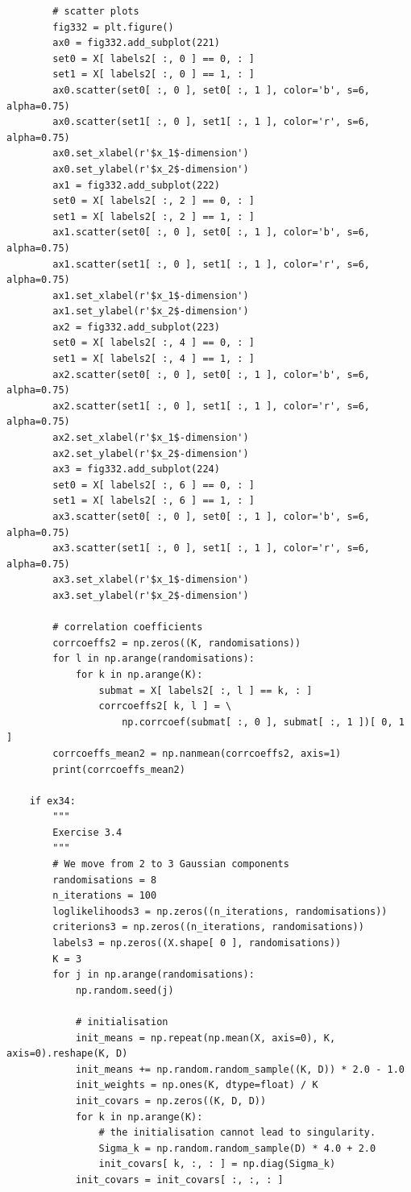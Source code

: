 \begin{verbatim}
        # scatter plots
        fig332 = plt.figure()
        ax0 = fig332.add_subplot(221)
        set0 = X[ labels2[ :, 0 ] == 0, : ]
        set1 = X[ labels2[ :, 0 ] == 1, : ]
        ax0.scatter(set0[ :, 0 ], set0[ :, 1 ], color='b', s=6, alpha=0.75)
        ax0.scatter(set1[ :, 0 ], set1[ :, 1 ], color='r', s=6, alpha=0.75)
        ax0.set_xlabel(r'$x_1$-dimension')
        ax0.set_ylabel(r'$x_2$-dimension')
        ax1 = fig332.add_subplot(222)
        set0 = X[ labels2[ :, 2 ] == 0, : ]
        set1 = X[ labels2[ :, 2 ] == 1, : ]
        ax1.scatter(set0[ :, 0 ], set0[ :, 1 ], color='b', s=6, alpha=0.75)
        ax1.scatter(set1[ :, 0 ], set1[ :, 1 ], color='r', s=6, alpha=0.75)
        ax1.set_xlabel(r'$x_1$-dimension')
        ax1.set_ylabel(r'$x_2$-dimension')
        ax2 = fig332.add_subplot(223)
        set0 = X[ labels2[ :, 4 ] == 0, : ]
        set1 = X[ labels2[ :, 4 ] == 1, : ]
        ax2.scatter(set0[ :, 0 ], set0[ :, 1 ], color='b', s=6, alpha=0.75)
        ax2.scatter(set1[ :, 0 ], set1[ :, 1 ], color='r', s=6, alpha=0.75)
        ax2.set_xlabel(r'$x_1$-dimension')
        ax2.set_ylabel(r'$x_2$-dimension')
        ax3 = fig332.add_subplot(224)
        set0 = X[ labels2[ :, 6 ] == 0, : ]
        set1 = X[ labels2[ :, 6 ] == 1, : ]
        ax3.scatter(set0[ :, 0 ], set0[ :, 1 ], color='b', s=6, alpha=0.75)
        ax3.scatter(set1[ :, 0 ], set1[ :, 1 ], color='r', s=6, alpha=0.75)
        ax3.set_xlabel(r'$x_1$-dimension')
        ax3.set_ylabel(r'$x_2$-dimension')

        # correlation coefficients
        corrcoeffs2 = np.zeros((K, randomisations))
        for l in np.arange(randomisations):
            for k in np.arange(K):
                submat = X[ labels2[ :, l ] == k, : ]
                corrcoeffs2[ k, l ] = \
                    np.corrcoef(submat[ :, 0 ], submat[ :, 1 ])[ 0, 1 ]
        corrcoeffs_mean2 = np.nanmean(corrcoeffs2, axis=1)
        print(corrcoeffs_mean2)

    if ex34:
        """
        Exercise 3.4
        """
        # We move from 2 to 3 Gaussian components
        randomisations = 8
        n_iterations = 100
        loglikelihoods3 = np.zeros((n_iterations, randomisations))
        criterions3 = np.zeros((n_iterations, randomisations))
        labels3 = np.zeros((X.shape[ 0 ], randomisations))
        K = 3
        for j in np.arange(randomisations):
            np.random.seed(j)

            # initialisation
            init_means = np.repeat(np.mean(X, axis=0), K, axis=0).reshape(K, D)
            init_means += np.random.random_sample((K, D)) * 2.0 - 1.0
            init_weights = np.ones(K, dtype=float) / K
            init_covars = np.zeros((K, D, D))
            for k in np.arange(K):
                # the initialisation cannot lead to singularity.
                Sigma_k = np.random.random_sample(D) * 4.0 + 2.0
                init_covars[ k, :, : ] = np.diag(Sigma_k)
            init_covars = init_covars[ :, :, : ]


\end{verbatim}
